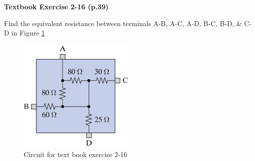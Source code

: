 \documentclass{handout}
\begin{document}
\clearpage

\textbf{Textbook Exercise 2-16 (p.39)}

Find the equivalent resistance between terminals A-B, A-C, A-D, B-C, B-D, \& C-D in Figure \ref{fig: Ex2_16}

\begin{figure}[h t b]
\centering
\includegraphics[width=0.5\textwidth]{Ex2_16.jpg}
\caption{Circuit for text book exercise 2-16}
\label{fig: Ex2_16}
\end{figure}
\end{document}
